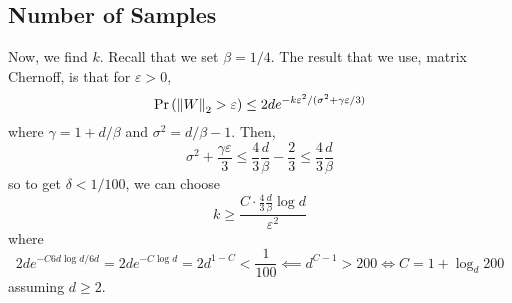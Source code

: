 \documentclass{article}
\begin{document}
\subsection{Number of Samples}
Now, we find $k$. Recall that we set $\beta = 1/4$. The result that we use, matrix Chernoff, is that for $\varepsilon>0$,
\[
	\Pr\left(\left\Vert W\right\Vert_2>\varepsilon\right)\leq 2de^{-k\varepsilon^2/(\sigma^2+\gamma\varepsilon/3)}
\]
where $\gamma = 1+d/\beta$ and $\sigma^2 = d/\beta - 1$. Then,
\[
	\sigma^2 + \frac{\gamma\varepsilon}3\leq \frac43\frac{d}{\beta} - \frac23\leq \frac43\frac{d}{\beta}
\]
so to get $\delta < 1/100$, we can choose
\[
	k\geq \frac{C\cdot \frac43\frac{d}{\beta}\log d}{\varepsilon^2}
\]
where
\[
	2de^{-C6d\log d/6d} = 2de^{-C\log d} = 2d^{1-C}<\frac1{100}\impliedby d^{C-1}>200\iff C = 1 + \log_d 200
\]
assuming $d\geq 2$. 



\end{document}
